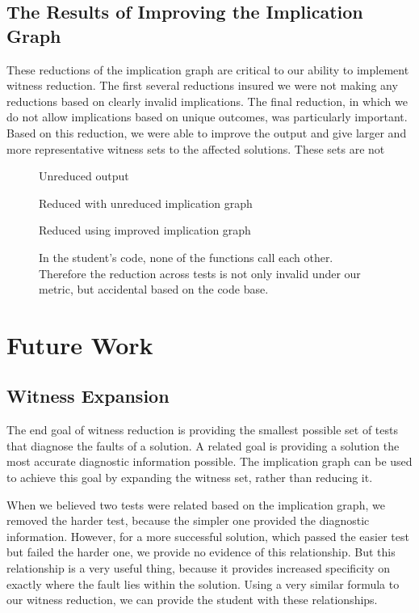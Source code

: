 \documentclass[11pt,twoside]{article}
\begin{document}
\subsection{The Results  of Improving the Implication Graph}

These reductions of the implication graph are critical to our ability to implement witness reduction. The first several reductions insured we were not making any reductions based on clearly invalid implications. The final reduction, in which we do not allow implications based on unique outcomes, was particularly important. Based on this reduction, we were able to improve the output and give larger and more representative witness sets to the affected solutions. These sets are not 

\begin{figure}

\caption{Unreduced output}

\caption{Reduced with unreduced implication graph}

\caption{Reduced using improved implication graph}
\caption{In the student's code, none of the functions call each other. Therefore the reduction across tests is not only invalid under our metric, but accidental based on the code base.}
\end{figure}

\section{Future Work}
\subsection{Witness Expansion}

The end goal of witness reduction is providing the smallest possible set of tests that diagnose the faults of a solution. A related goal is providing a solution the most accurate diagnostic information possible. The implication graph can be used to achieve this goal by expanding the witness set, rather than reducing it.

When we believed two tests were related based on the implication graph, we removed the harder test, because the simpler one provided the diagnostic information. However, for a more successful solution, which passed the easier test but failed the harder one, we provide no evidence of this relationship. But this relationship is a very useful thing, because it provides increased specificity on exactly where the fault lies within the solution. Using a very similar formula to our witness reduction, we can provide the student with these relationships.
\end{document}
